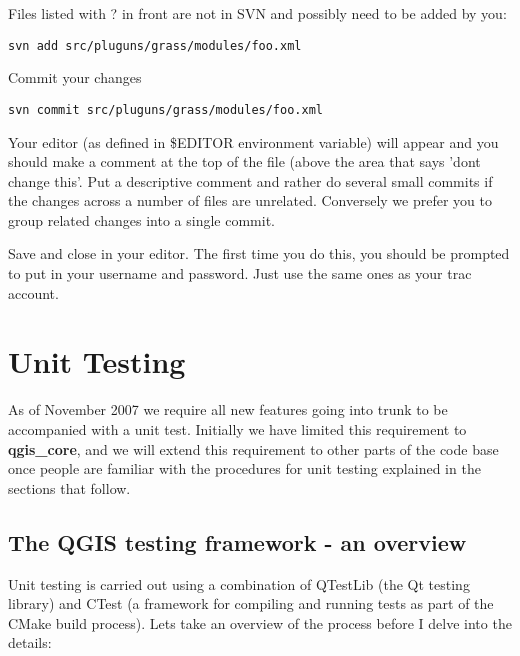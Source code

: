 Files listed with ? in front are not in SVN and possibly need to be added by
you:

\begin{verbatim}
svn add src/pluguns/grass/modules/foo.xml
\end{verbatim}

Commit your changes

\begin{verbatim}
svn commit src/pluguns/grass/modules/foo.xml
\end{verbatim}

Your editor (as defined in \$EDITOR environment variable) will appear and you
should make a comment at the top of the file (above the area that says 'dont
change this'. Put a descriptive comment and rather do several small commits if
the changes across a number of files are unrelated. Conversely we prefer you to
group related changes into a single commit.

Save and close in your editor. The first time you do this, you should be
prompted to put in your username and password. Just use the same ones as your
trac account.


\section{Unit Testing}
As of November 2007 we require all new features going into trunk to be
accompanied with a unit test. Initially we have limited this requirement to
\textbf{qgis\_core}, and we will extend this requirement to other parts of the code base
once people are familiar with the procedures for unit testing explained in the
sections that follow.

\subsection{The QGIS testing framework  - an overview}
Unit testing is carried out using a combination of QTestLib (the Qt testing
library) and CTest (a framework for compiling and running tests as part of the
CMake build process).  Lets take an overview of the process before I delve into
the details:

